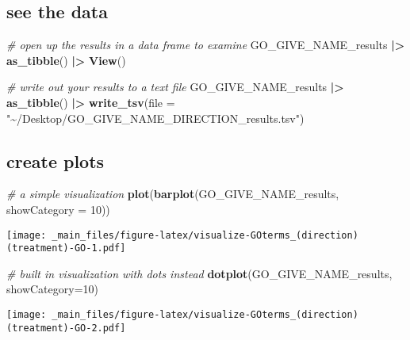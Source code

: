 \documentclass[
]{book}
\newenvironment{Shaded}{\begin{snugshade}}{\end{snugshade}}
\newcommand{\AttributeTok}[1]{\textcolor[rgb]{0.13,0.29,0.53}{#1}}
\newcommand{\CommentTok}[1]{\textcolor[rgb]{0.56,0.35,0.01}{\textit{#1}}}
\newcommand{\DecValTok}[1]{\textcolor[rgb]{0.00,0.00,0.81}{#1}}
\newcommand{\FunctionTok}[1]{\textcolor[rgb]{0.13,0.29,0.53}{\textbf{#1}}}
\newcommand{\NormalTok}[1]{#1}
\newcommand{\SpecialCharTok}[1]{\textcolor[rgb]{0.81,0.36,0.00}{\textbf{#1}}}
\newcommand{\StringTok}[1]{\textcolor[rgb]{0.31,0.60,0.02}{#1}}
\begin{document}
\hypertarget{see-the-data}{%
\subsection{see the data}\label{see-the-data}}

\begin{Shaded}
\begin{Highlighting}[]
\CommentTok{\# open up the results in a data frame to examine}
\NormalTok{GO\_GIVE\_NAME\_results }\SpecialCharTok{|\textgreater{}}
  \FunctionTok{as\_tibble}\NormalTok{() }\SpecialCharTok{|\textgreater{}}
  \FunctionTok{View}\NormalTok{()}

\CommentTok{\# write out your results to a text file}
\NormalTok{GO\_GIVE\_NAME\_results }\SpecialCharTok{|\textgreater{}}
  \FunctionTok{as\_tibble}\NormalTok{() }\SpecialCharTok{|\textgreater{}}
  \FunctionTok{write\_tsv}\NormalTok{(}\AttributeTok{file =} \StringTok{"\textasciitilde{}/Desktop/GO\_GIVE\_NAME\_DIRECTION\_results.tsv"}\NormalTok{)}
\end{Highlighting}
\end{Shaded}

\hypertarget{create-plots}{%
\subsection{create plots}\label{create-plots}}

\begin{Shaded}
\begin{Highlighting}[]
\CommentTok{\# a simple visualization}
\FunctionTok{plot}\NormalTok{(}\FunctionTok{barplot}\NormalTok{(GO\_GIVE\_NAME\_results, }\AttributeTok{showCategory =} \DecValTok{10}\NormalTok{))}
\end{Highlighting}
\end{Shaded}

\texttt{[image: \_main\_files/figure-latex/visualize-GOterms\_(direction)(treatment)-GO-1.pdf]}

\begin{Shaded}
\begin{Highlighting}[]
\CommentTok{\# built in visualization with dots instead}
\FunctionTok{dotplot}\NormalTok{(GO\_GIVE\_NAME\_results, }\AttributeTok{showCategory=}\DecValTok{10}\NormalTok{) }
\end{Highlighting}
\end{Shaded}

\texttt{[image: \_main\_files/figure-latex/visualize-GOterms\_(direction)(treatment)-GO-2.pdf]}
\end{document}
